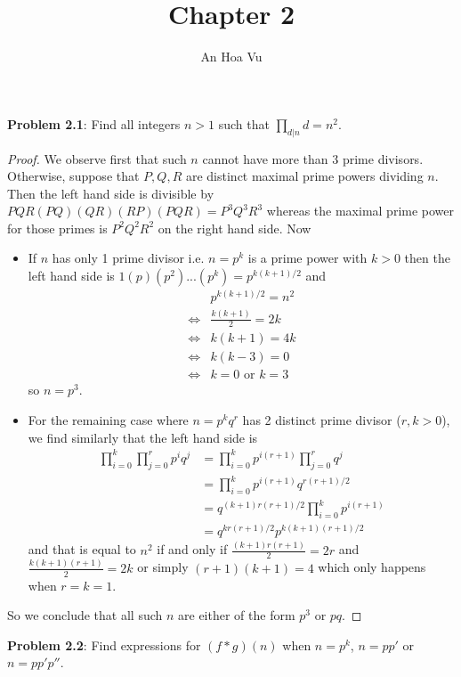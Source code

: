 \documentclass{article}
\title{Chapter 2}
\author{An Hoa Vu}
\begin{document}
\maketitle

\textbf{Problem 2.1}: Find all integers $n > 1$ such that $\prod_{d | n} d = n^2$.

\begin{proof}
We observe first that such $n$ cannot have more than 3 prime divisors. Otherwise, suppose that $P, Q, R$ are distinct maximal prime powers dividing $n$. Then the left hand side is divisible by $P Q R (PQ) (QR) (RP) (PQR) = P^3 Q^3 R^3$ whereas the maximal prime power for those primes is $P^2 Q^2 R^2$ on the right hand side. Now

\begin{itemize}
\item If $n$ has only 1 prime divisor i.e. $n = p^k$ is a prime power with $k > 0$ then the left hand side is $1 (p) (p^2) ... (p^k) = p^{k(k+1)/2}$ and
\begin{align*}
& p^{k(k+1)/2} = n^2\\
\iff & \frac{k(k+1)}{2} = 2k\\
\iff & k(k+1) = 4k\\
\iff & k(k - 3) = 0\\
\iff & k = 0 \text{ or } k = 3
\end{align*}
so $n = p^3$.

\item For the remaining case where $n = p^k q^r$ has 2 distinct prime divisor ($r, k > 0$), we find similarly that the left hand side is
\begin{align*}
\prod_{i = 0}^{k} \prod_{j = 0}^{r} p^i q^j
&= \prod_{i = 0}^{k} p^{i (r+1)} \prod_{j = 0}^{r}  q^j\\
&= \prod_{i = 0}^{k} p^{i (r+1)} q^{r(r+1)/2}\\
&= q^{(k+1) r(r+1)/2} \prod_{i = 0}^{k} p^{i (r+1)}\\
&= q^{kr(r+1)/2} p^{k(k+1)(r+1)/2}
\end{align*}
and that is equal to $n^2$ if and only if $\frac{(k+1)r(r+1)}{2} = 2r$ and $\frac{k(k+1)(r+1)}{2} = 2k$ or simply $(r + 1)(k + 1) = 4$ which only happens when $r = k = 1$.
\end{itemize}

So we conclude that all such $n$ are either of the form $p^3$ or $pq$.
\end{proof}

\textbf{Problem 2.2}: Find expressions for $(f*g)(n)$ when $n = p^k$, $n = pp'$ or $n = p p' p''$.
\end{document}
